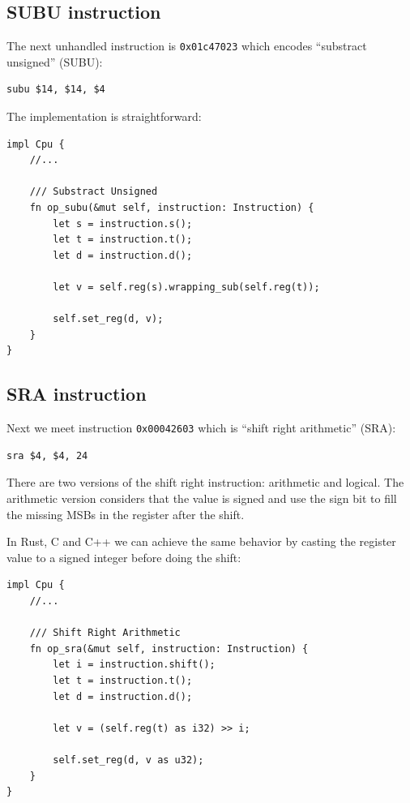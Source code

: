 \documentclass[a4paper]{article}
\newcommand{\code}[1] {\texttt{#1}}
\begin{document}
\subsection{SUBU instruction}

The next unhandled instruction is \code{0x01c47023} which encodes
``substract unsigned'' (SUBU):

\begin{lstlisting}[language=assembly]
subu $14, $14, $4
\end{lstlisting}

The implementation is straightforward:

\begin{lstlisting}
impl Cpu {
    //...

    /// Substract Unsigned
    fn op_subu(&mut self, instruction: Instruction) {
        let s = instruction.s();
        let t = instruction.t();
        let d = instruction.d();

        let v = self.reg(s).wrapping_sub(self.reg(t));

        self.set_reg(d, v);
    }
}
\end{lstlisting}

\subsection{SRA instruction}

Next we meet instruction \code{0x00042603} which is ``shift right
arithmetic'' (SRA):

\begin{lstlisting}[language=assembly]
sra $4, $4, 24
\end{lstlisting}

There are two versions of the shift right instruction: arithmetic and
logical. The arithmetic version considers that the value is signed and
use the sign bit to fill the missing MSBs in the register after the
shift.

In Rust, C and C++ we can achieve the same behavior by casting the
register value to a signed integer before doing the shift:

\begin{lstlisting}
impl Cpu {
    //...

    /// Shift Right Arithmetic
    fn op_sra(&mut self, instruction: Instruction) {
        let i = instruction.shift();
        let t = instruction.t();
        let d = instruction.d();

        let v = (self.reg(t) as i32) >> i;

        self.set_reg(d, v as u32);
    }
}
\end{lstlisting}
\end{document}
